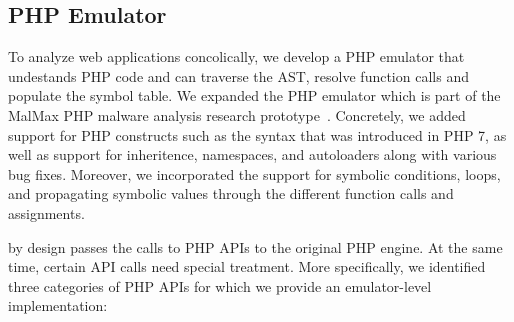 \subsection{PHP Emulator}
\label{sec:emulator}

To analyze web applications concolically, we develop a PHP emulator that undestands PHP code and can traverse the AST, resolve function calls and populate the symbol table. 
We expanded the PHP emulator which is part of the MalMax PHP malware analysis research prototype~\cite{naderi2019malmax}. 
Concretely, we added support for PHP constructs such as the syntax that was introduced in PHP 7, as well as support for inheritence, namespaces, and autoloaders along with various bug fixes. 
Moreover, we incorporated the support for symbolic conditions, loops, and propagating symbolic values through the different function calls and assignments. 

\animatedead{} by design passes the calls to PHP APIs to the original PHP engine. 
At the same time, certain API calls need special treatment. 
More specifically, we identified three categories of PHP APIs for which we provide an emulator-level implementation:


